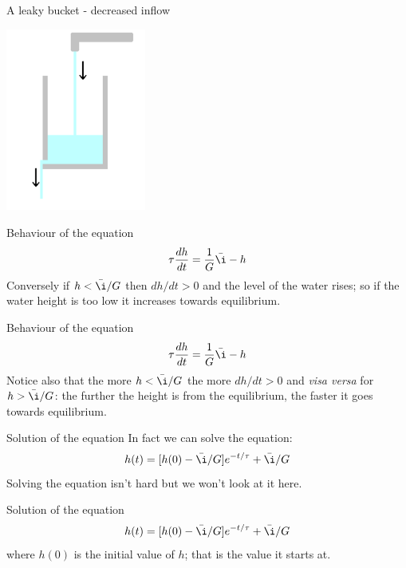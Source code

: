 \documentclass{beamer}
\newcommand{\crish}{\color{reddish}}
\newcommand{\cbla}{\color{black}}
\newcommand{\cblu}{\color{blue}}
\begin{document}
\begin{frame}{A leaky bucket - decreased inflow}

  \begin{center}
    \includegraphics[height=6cm]{glass_level_down.png}
  \end{center}
  
\end{frame}


\begin{frame}{Behaviour of the equation}
  \crish
  $$\tau\frac{dh}{dt}=\frac{1}{G}\bar{\i}-h$$\cbla Conversely if
  \cblu{}$h<\bar{\i}/G$\cbla{} then \cblu{}$dh/dt>0$\cbla{} and the
  level of the water rises; so if the water height is too low it
  increases towards equilibrium.
\end{frame}


\begin{frame}{Behaviour of the equation}
  \crish
  $$\tau\frac{dh}{dt}=\frac{1}{G}\bar{\i}-h$$\cbla Notice also that the more
  \crish{}$h<\bar{\i}/G$\cbla{} the more \crish{}$dh/dt>0$\cbla{} and \textsl{visa versa} for \crish{}$h>\bar{\i}/G$\cbla: the further the height is from the equilibrium, the faster it goes towards equilibrium.
\end{frame}


\begin{frame}{Solution of the equation}
  In fact we can solve the equation:\crish{}
$$h(t)=[h(0)-\bar{\i}/G]e^{-t/\tau}+\bar{\i}/G$$
\cbla{}Solving the equation isn't hard but we won't look at it here.
\end{frame}


\begin{frame}{Solution of the equation}
  \crish{}
$$h(t)=[\cblu{}h(0)\crish{}-\bar{\i}/G]e^{-t/\tau}+\bar{\i}/G$$
\cbla{}where \cblu$h(0)$\cbla{} is the initial value of \crish$h$\cbla{}; that is the value it starts at.
\end{frame}
\end{document}
